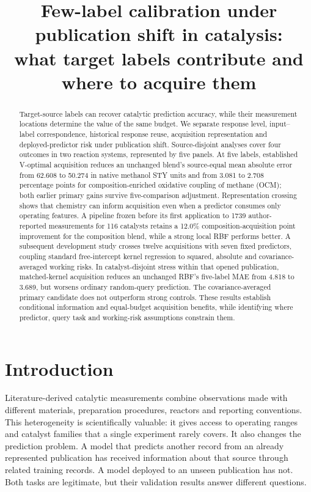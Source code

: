 \documentclass[11pt]{article}
\title{Few-label calibration under publication shift in catalysis:\\what target labels contribute and where to acquire them}
\author{}
\date{}
\begin{document}
\maketitle
\begin{abstract}
Target-source labels can recover catalytic prediction accuracy, while their measurement locations determine the value of the same budget. We separate response level, input--label correspondence, historical response reuse, acquisition representation and deployed-predictor risk under publication shift. Source-disjoint analyses cover four outcomes in two reaction systems, represented by five panels. At five labels, established V-optimal acquisition reduces an unchanged blend's source-equal mean absolute error from 62.608 to 50.274 in native methanol STY units and from 3.081 to 2.708 percentage points for composition-enriched oxidative coupling of methane (OCM); both earlier primary gains survive five-comparison adjustment. Representation crossing shows that chemistry can inform acquisition even when a predictor consumes only operating features. A pipeline frozen before its first application to 1739 author-reported measurements for 116 catalysts retains a 12.0\% composition-acquisition point improvement for the composition blend, while a strong local RBF performs better. A subsequent development study crosses twelve acquisitions with seven fixed predictors, coupling standard free-intercept kernel regression to squared, absolute and covariance-averaged working risks. In catalyst-disjoint stress within that opened publication, matched-kernel acquisition reduces an unchanged RBF's five-label MAE from 4.818 to 3.689, but worsens ordinary random-query prediction. The covariance-averaged primary candidate does not outperform strong controls. These results establish conditional information and equal-budget acquisition benefits, while identifying where predictor, query task and working-risk assumptions constrain them.
\end{abstract}

\section{Introduction}
Literature-derived catalytic measurements combine observations made with different materials, preparation procedures, reactors and reporting conventions. This heterogeneity is scientifically valuable: it gives access to operating ranges and catalyst families that a single experiment rarely covers. It also changes the prediction problem. A model that predicts another record from an already represented publication has received information about that source through related training records. A model deployed to an unseen publication has not. Both tasks are legitimate, but their validation results answer different questions.
\end{document}
